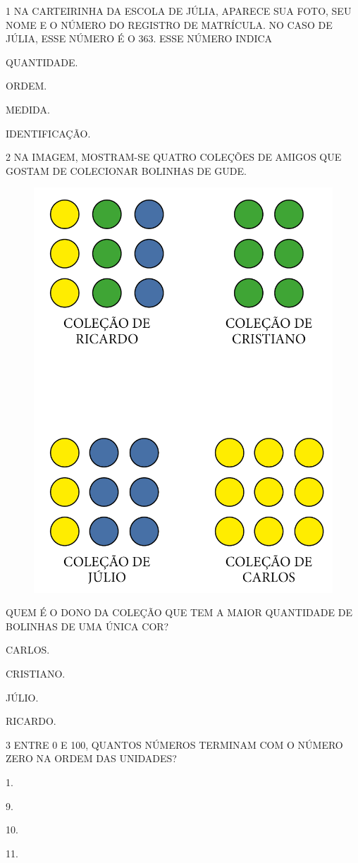 \num{1} NA CARTEIRINHA DA ESCOLA DE JÚLIA, APARECE SUA FOTO, SEU NOME E O NÚMERO DO
REGISTRO DE MATRÍCULA. NO CASO DE JÚLIA, ESSE NÚMERO É O 363. ESSE NÚMERO INDICA

\begin{escolha}
\item
  QUANTIDADE.
\item
  ORDEM.
\item
  MEDIDA.
\item
  IDENTIFICAÇÃO.
\end{escolha}

\num{2} NA IMAGEM, MOSTRAM-SE QUATRO COLEÇÕES DE AMIGOS QUE GOSTAM DE COLECIONAR
BOLINHAS DE GUDE.

\begin{figure}[H]
\centering
\includegraphics[width=.5\textwidth]{./media/SAEB_1ANO_MAT_FIGURA16.png}
\end{figure}

\noindent{}QUEM É O DONO DA COLEÇÃO QUE TEM A MAIOR QUANTIDADE DE BOLINHAS DE UMA ÚNICA COR?

\begin{escolha}
\item
  CARLOS.
\item
  CRISTIANO.
\item
  JÚLIO.
\item
  RICARDO.
\end{escolha}

\num{3} ENTRE 0 E 100, QUANTOS NÚMEROS TERMINAM COM O NÚMERO ZERO NA ORDEM DAS UNIDADES?

\begin{multicols}{2}
\begin{escolha}
\item
  1.
\item
  9.
\item
  10.
\item
  11.
\end{escolha}
\end{multicols}

